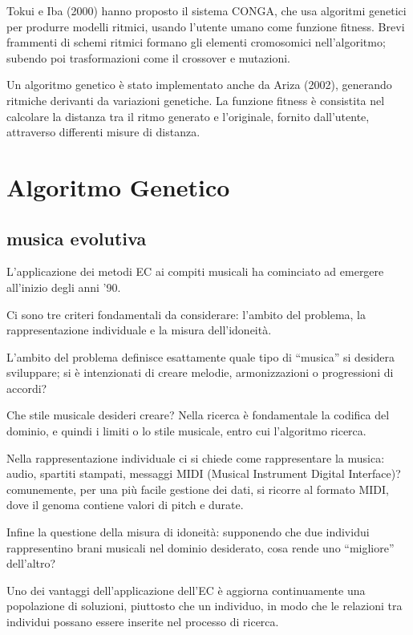 \documentclass[a4paper,12pt]{report}
\begin{document}
Tokui e Iba (2000) hanno proposto il sistema CONGA, che usa algoritmi genetici per produrre modelli ritmici, usando l'utente umano come funzione fitness.
Brevi frammenti di schemi ritmici formano gli elementi cromosomici nell'algoritmo; subendo poi trasformazioni come il crossover e mutazioni. 

Un algoritmo genetico è stato implementato anche da Ariza (2002), generando ritmiche derivanti da variazioni genetiche.
La funzione fitness è consistita nel calcolare la distanza tra il ritmo generato e l'originale, fornito dall'utente, attraverso differenti misure di distanza. 

\section{Algoritmo Genetico}

\subsection{musica evolutiva}

L'applicazione dei metodi EC ai compiti musicali ha cominciato ad emergere all'inizio degli anni '90.

Ci sono tre criteri fondamentali da considerare: l'ambito del problema, la rappresentazione individuale e la misura dell'idoneità. 

L’ambito del problema definisce esattamente quale tipo di “musica” si desidera sviluppare; si è intenzionati di creare melodie, armonizzazioni o progressioni di accordi? 

Che stile musicale desideri creare? 
Nella ricerca è fondamentale la codifica del dominio, e quindi i limiti o lo stile musicale, entro cui l'algoritmo ricerca. 

Nella rappresentazione individuale ci si chiede come rappresentare la musica: audio, spartiti stampati, messaggi MIDI (Musical Instrument Digital Interface)? 
comunemente, per una più facile gestione dei dati, si ricorre al formato MIDI, dove il genoma contiene valori di pitch e durate. 

Infine la questione della misura di idoneità: supponendo che due individui rappresentino brani musicali nel dominio desiderato, cosa rende uno “migliore” dell’altro? 

Uno dei vantaggi dell'applicazione dell'EC è aggiorna continuamente una popolazione di soluzioni, piuttosto che un individuo, in modo che le relazioni tra individui possano essere inserite nel processo di ricerca. 
\end{document}
